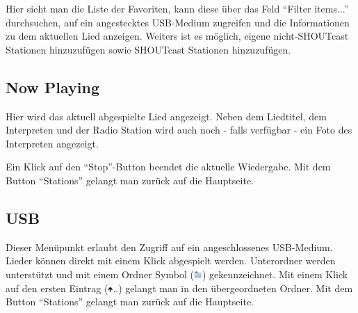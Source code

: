 \documentclass[12pt,a4paper,openany]{memoir}
\begin{document}
Hier sieht man die Liste der Favoriten, kann diese über das Feld ``Filter items...'' durchsuchen, auf ein angestecktes USB-Medium zugreifen und die Informationen zu dem aktuellen Lied anzeigen. 
Weiters ist es möglich, eigene nicht-SHOUTcast Stationen hinzuzufügen sowie SHOUTcast Stationen hinzuzufügen. 

\subsection{Now Playing}
Hier wird das aktuell abgespielte Lied angezeigt. Neben dem Liedtitel, dem Interpreten und der Radio Station wird auch noch - falls verfügbar - ein Foto des Interpreten angezeigt. 


Ein Klick auf den ``Stop''-Button beendet die aktuelle Wiedergabe. 
Mit dem Button ``Stations'' gelangt man zurück auf die Hauptseite. 

\subsection{USB}

Dieser Menüpunkt erlaubt den Zugriff auf ein angeschlossenes USB-Medium. Lieder können direkt mit einem Klick abgespielt werden. 
Unterordner werden unterstützt und mit einem Ordner Symbol (\includegraphics[width=12px]{images/folder.png}) gekennzeichnet. Mit einem Klick auf den ersten Eintrag 
(\includegraphics[width=7px]{images/arrow_up.png}..) gelangt man in den übergeordneten Ordner. Mit dem Button ``Stations'' gelangt man zurück auf die Hauptseite. 
\end{document}
